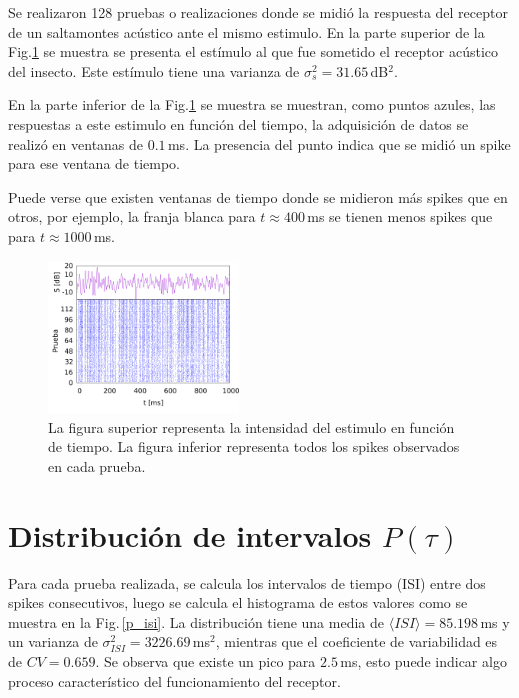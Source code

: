 Se realizaron 128 pruebas o realizaciones  donde se midió la respuesta del receptor de un saltamontes  acústico ante el mismo estimulo. En la parte superior de la Fig.\ref{experimento} se muestra se presenta el estímulo al que fue sometido el receptor acústico del insecto. Este estímulo tiene una varianza de  $\sigma^2_{s}= 31.65\,$dB$^2$.  

En la parte inferior de la Fig.\ref{experimento} se muestra se muestran, como puntos azules, las respuestas a este estimulo en función del tiempo, la adquisición de datos se realizó en ventanas de $0.1\,$ms. La presencia del punto indica que se midió un spike para ese ventana de tiempo. 

Puede verse que existen ventanas de tiempo donde se midieron más spikes que en otros, por ejemplo, la franja blanca para $t \approx 400\,$ms se tienen menos spikes que para $t\approx 1000\,$ms.

\begin{figure}[H]
	\centering
	\includegraphics[width=0.45\textwidth]{../Graficos/stimulus.png}
	\caption{La figura superior representa la intensidad del estimulo en función de tiempo. La figura inferior representa todos los spikes observados en cada prueba.}
	\label{experimento}
\end{figure}


\section*{Distribución de intervalos \texorpdfstring{$P(\tau)$}{}}

Para cada prueba realizada, se calcula los intervalos de tiempo (ISI) entre dos spikes consecutivos, luego se calcula el histograma de estos valores como se muestra en la Fig.\,\ref{p_isi}. La distribución tiene una media de $\langle ISI \rangle = 85.198\,$ms y un varianza de $\sigma^2_{ISI}=3226.69\,$ms$^2$, mientras que el coeficiente de variabilidad es de $CV=0.659$. Se observa que existe un pico para $2.5\,$ms, esto puede indicar algo proceso característico del funcionamiento del receptor.


